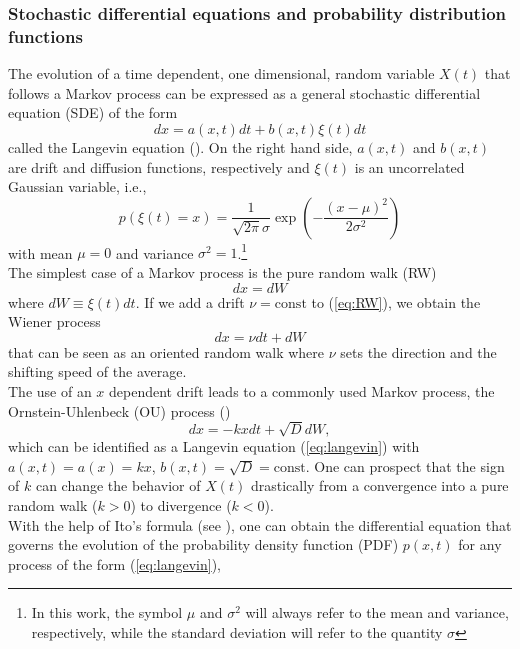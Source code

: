 \subsubsection{Stochastic differential equations and probability distribution functions}
The evolution of a time dependent, one dimensional, random variable $X(t)$ that follows a Markov process can be expressed as a general stochastic differential equation (SDE) of the form
\begin{equation}
	dx = a(x,t)dt + b(x,t)\xi(t)dt
	\label{eq:langevin}
\end{equation}
called the Langevin equation (\citet[Eq. 4.1.1]{Gardiner1996}). 
On the right hand side, $a(x,t)$ and $b(x,t)$ are drift and diffusion functions, respectively and $\xi(t)$ is an uncorrelated Gaussian variable, i.e.,
\[
p(\xi(t)=x)=\frac{1}{\sqrt{2\pi}\sigma}\exp(-\frac{(x-\mu)^2}{2\sigma^2})
\]
with mean $\mu=0$ and variance $\sigma^2=1$.\footnote{In this work, the symbol $\mu$ and $\sigma^2$ will always refer to the mean and variance, respectively, while the standard deviation will refer to the quantity $\sigma$}\\
The simplest case of a Markov process is the pure random walk (RW)
\begin{equation}\label{eq:RW}
	dx = dW
\end{equation}
where $dW\equiv\xi(t)dt$.
If we add a drift $\nu=\mathrm{const}$ to (\ref{eq:RW}), we obtain the Wiener process
\begin{equation}\label{eq:wiener}
dx = \nu dt + dW
\end{equation}
that can be seen as an oriented random walk where $\nu$ sets the direction and the shifting speed of the average.\\
The use of an $x$ dependent drift leads to a commonly used Markov process, the Ornstein-Uhlenbeck (OU) process (\citet[Sec. 3.8.4]{Gardiner1996})
\begin{equation}
dx = -kxdt + \sqrt{D}dW,
\label{eq:OU}
\end{equation}
which can be identified as a Langevin equation (\ref{eq:langevin}) with $a(x,t)=a(x)=kx$, $b(x,t)=\sqrt{D}=\mathrm{const}$. 
One can prospect that the sign of $k$ can change the behavior of $X(t)$ drastically from a convergence into a pure random walk ($k>0$) to divergence ($k<0$).\\
With the help of Ito's formula (see \citet[Sec. 4.3.4]{Gardiner1996}), one can obtain the differential equation that governs the evolution of the probability density function (PDF) $p(x,t)$ for any process of the form (\ref{eq:langevin}),
